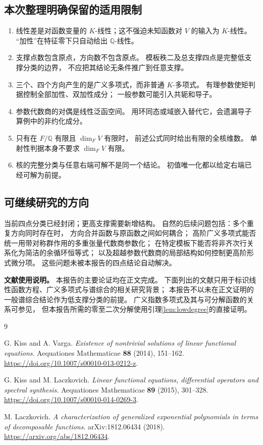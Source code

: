 \documentclass[UTF8,11pt,a4paper]{ctexart}
\theoremstyle{definition}
\newcommand{\Q}{\mathbb Q}
\numberwithin{equation}{section}
\begin{document}
\subsection{本次整理明确保留的适用限制}
\begin{enumerate}
\item 线性差是对函数变量的 $K$-线性；这不强迫未知函数对 $V$ 的输入为 $K$-线性。
“加性”在特征零下只自动给出 $\Q$-线性。
\item 支撑点数包含原点，方向数不包含原点。
模板秩二及总支撑四点是完整低支撑分类的边界，
不应把其结论无条件推广到任意支撑。
\item 三个、四个方向产生的是广义多项式，而非普通 $K$-多项式。
有理参数使矩判据控制全部加性、双加性成分；
一般参数可能引入共轭和导子。
\item 参数代数商的对偶是线性泛函空间。
用环同态或域嵌入替代它，会遗漏导子算例中的非约化成分。
\item 只有在 $F/\Q$ 有限且 $\dim_FV$ 有限时，
前述公式同时给出有限的全核维数。
单射性判据本身不要求 $\dim_FV$ 有限。
\item 核的完整分类与任意右端可解不是同一个结论。
初值唯一化都以给定右端已经可解为前提。
\end{enumerate}

\subsection{可继续研究的方向}
当前四点分类已经封闭；更高支撑需要新增结构。
自然的后续问题包括：多个重复方向同时存在时，
方向合并函数与原函数之间如何耦合；
高阶广义多项式能否统一用带对称群作用的多重张量代数商参数化；
在特定模板下能否将非齐次行关系化为简洁的余循环恒等式；
以及超越参数代数商的局部结构如何控制更高阶形式微分项。
这些问题未被本报告的四点结论自动解决。

\medskip
\noindent\textbf{文献使用说明。}
本报告的主要论证均在正文完成。
下面列出的文献只用于标识线性函数方程、广义多项式与谱综合的相关研究背景；
本报告不以未在正文证明的一般谱综合结论作为低支撑分类的前提。
广义指数多项式及其与可分解函数的关系可参见\cite{Laczkovich2018}，
但本报告所需的零至二次分解使用引理\ref{lem:lowdegree}的直接证明。

\begin{thebibliography}{9}
\raggedright
{}
G. Kiss and A. Varga.
\textit{Existence of nontrivial solutions of linear functional equations}.
Aequationes Mathematicae \textbf{88} (2014), 151--162.
\url{https://doi.org/10.1007/s00010-013-0212-z}.

G. Kiss and M. Laczkovich.
\textit{Linear functional equations, differential operators and spectral synthesis}.
Aequationes Mathematicae \textbf{89} (2015), 301--328.
\url{https://doi.org/10.1007/s00010-014-0269-3}.

M. Laczkovich.
\textit{A characterization of generalized exponential polynomials in terms of decomposable functions}.
arXiv:1812.06434 (2018).
\url{https://arxiv.org/abs/1812.06434}.
\end{thebibliography}
\end{document}
